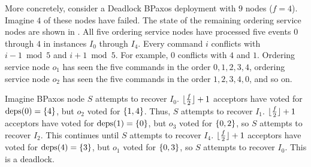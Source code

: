 More concretely, consider a Deadlock BPaxos deployment with $9$ nodes ($f =
4$). Imagine $4$ of these nodes have failed. The state of the remaining
ordering service nodes are shown in . All five
ordering service nodes have processed five events $0$ through $4$ in instances
$I_0$ through $I_4$. Every command $i$ conflicts with $i - 1 \bmod 5$ and $i +
1 \bmod 5$. For example, $0$ conflicts with $4$ and $1$. Ordering service node
$o_1$ has seen the five commands in the order $0, 1, 2, 3, 4$, ordering service
node $o_2$ has seen the five commands in the order $1, 2, 3, 4, 0$, and so on.

{}

Imagine BPaxos node $S$ attempts to recover $I_0$. $\lfloor\frac{f}{2}\rfloor + 1$
acceptors have voted for $\text{deps}(0) = \{4\}$, but $o_2$ voted for $\{1,
4\}$. Thus, $S$ attempts to recover $I_1$. $\lfloor\frac{f}{2}\rfloor + 1$ acceptors have
voted for $\text{deps}(1) = \{0\}$, but $o_3$ voted for $\{0, 2\}$, so $S$
attempts to recover $I_2$. This continues until $S$ attempts to recover $I_4$.
$\lfloor\frac{f}{2}\rfloor + 1$ acceptors have voted for $\text{deps}(4) = \{3\}$, but $o_1$
voted for $\{0, 3\}$, so $S$ attempts to recover $I_0$. This is a deadlock.


